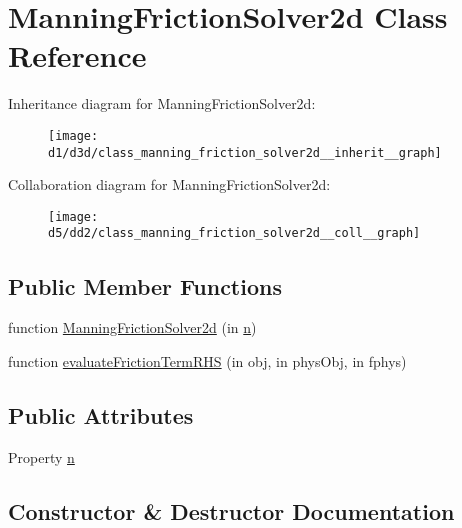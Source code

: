 \hypertarget{class_manning_friction_solver2d}{}\section{Manning\+Friction\+Solver2d Class Reference}
\label{class_manning_friction_solver2d}


Inheritance diagram for Manning\+Friction\+Solver2d\+:
\nopagebreak
\begin{figure}[H]
\begin{center}
\leavevmode
\texttt{[image: d1/d3d/class\_manning\_friction\_solver2d\_\_inherit\_\_graph]}
\end{center}
\end{figure}


Collaboration diagram for Manning\+Friction\+Solver2d\+:
\nopagebreak
\begin{figure}[H]
\begin{center}
\leavevmode
\texttt{[image: d5/dd2/class\_manning\_friction\_solver2d\_\_coll\_\_graph]}
\end{center}
\end{figure}
\subsection*{Public Member Functions}
\begin{DoxyCompactItemize}
\item 
function \hyperlink{class_manning_friction_solver2d_a7265c151f01b733cc42294436b000ac6}{Manning\+Friction\+Solver2d} (in \hyperlink{class_manning_friction_solver2d_a47e42cca8e9bc55a8c90590bca7b9b30}{n})
\item 
function \hyperlink{class_manning_friction_solver2d_a34fde4668575b474308be55c92498f3d}{evaluate\+Friction\+Term\+R\+HS} (in obj, in phys\+Obj, in fphys)
\end{DoxyCompactItemize}
\subsection*{Public Attributes}
\begin{DoxyCompactItemize}
\item 
Property \hyperlink{class_manning_friction_solver2d_a47e42cca8e9bc55a8c90590bca7b9b30}{n}
\end{DoxyCompactItemize}


\subsection{Constructor \& Destructor Documentation}
\mbox{\label{class_manning_friction_solver2d_a7265c151f01b733cc42294436b000ac6}} 
